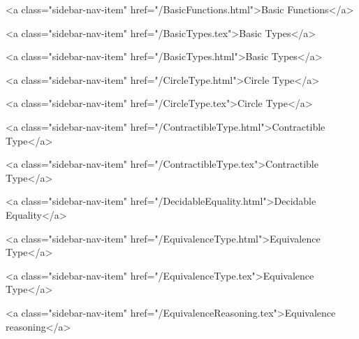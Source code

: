           <a class="sidebar-nav-item" href="/BasicFunctions.html">Basic Functions</a>
        
      
    
      
        
          <a class="sidebar-nav-item" href="/BasicTypes.tex">Basic Types</a>
        
      
    
      
        
          <a class="sidebar-nav-item" href="/BasicTypes.html">Basic Types</a>
        
      
    
      
        
          <a class="sidebar-nav-item" href="/CircleType.html">Circle Type</a>
        
      
    
      
        
          <a class="sidebar-nav-item" href="/CircleType.tex">Circle Type</a>
        
      
    
      
        
          <a class="sidebar-nav-item" href="/ContractibleType.html">Contractible Type</a>
        
      
    
      
        
          <a class="sidebar-nav-item" href="/ContractibleType.tex">Contractible Type</a>
        
      
    
      
        
          <a class="sidebar-nav-item" href="/DecidableEquality.html">Decidable Equality</a>
        
      
    
      
        
          <a class="sidebar-nav-item" href="/EquivalenceType.html">Equivalence Type</a>
        
      
    
      
        
          <a class="sidebar-nav-item" href="/EquivalenceType.tex">Equivalence Type</a>
        
      
    
      
        
          <a class="sidebar-nav-item" href="/EquivalenceReasoning.tex">Equivalence reasoning</a>
        
      
    
